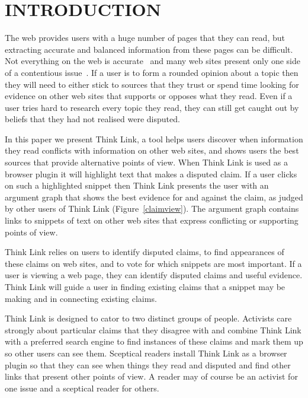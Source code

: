 \documentclass{chi2009}
\begin{document}

\section{INTRODUCTION}

The web provides users with a huge number of pages that they can read, but extracting accurate and balanced information from these pages can be difficult. Not everything on the web is accurate~\cite{Mintz2002,Neumann2003,Resnik1998,Zhou2004} and many web sites present only one side of a contentious issue~\cite{Herman2002,Gentzkow2007}. If a user is to form a rounded opinion about a topic then they will need to either stick to sources that they trust or spend time looking for evidence on other web sites that supports or opposes what they read. Even if a user tries hard to research every topic they read, they can still get caught out by beliefs that they had not realised were disputed.

In this paper we present Think Link, a tool helps users discover when information they read conflicts with information on other web sites, and shows users the best sources that provide alternative points of view. When Think Link is used as a browser plugin it will highlight text that makes a disputed claim. If a user clicks on such a highlighted snippet then Think Link presents the user with an argument graph that shows the best evidence for and against the claim, as judged by other users of Think Link (Figure~\ref{claimview}). The argument graph contains links to snippets of text on other web sites that express conflicting or supporting points of view.

Think Link relies on users to identify disputed claims, to find appearances of these claims on web sites, and to vote for which snippets are most important. If a user is viewing a web page, they can identify disputed claims and useful evidence. Think Link will guide a user in finding existing claims that a snippet may be making and in connecting existing claims.

Think Link is designed to cator to two distinct groups of people. Activists care strongly about particular claims that they disagree with and combine Think Link with a preferred search engine to find instances of these claims and mark them up so other users can see them. Sceptical readers install Think Link as a browser plugin so that they can see when things they read and disputed and find other links that present other points of view. A reader may of course be an activist for one issue and a sceptical reader for others.
\end{document}
